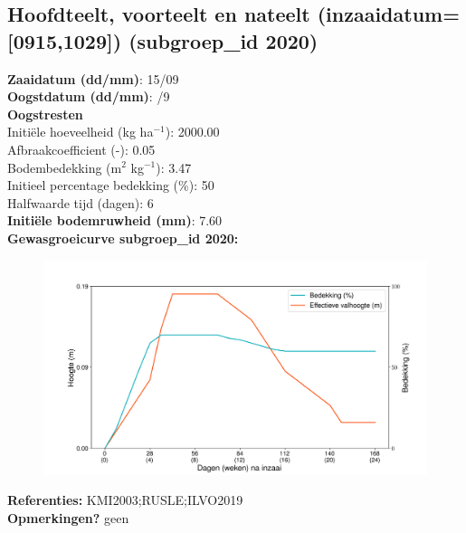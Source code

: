 \documentclass{article}
\begin{document}
 \subsection{Hoofdteelt, voorteelt en nateelt (inzaaidatum=[0915,1029]) (subgroep\_id 2020)} 
  \textbf{Zaaidatum (dd/mm)}: 15/09  \vspace{0.10cm} \\ 
  \textbf{Oogstdatum (dd/mm)}: /9  \vspace{0.10cm} \\ 
  \textbf{Oogstresten} \vspace{0.05cm} \\ 
  \tab Initi\"{e}le hoeveelheid (kg ha$^{-1}$): 2000.00 \vspace{0.05cm} \\ 
  \tab Afbraakcoefficient (-): 0.05 \vspace{0.05cm} \\ 
  \tab Bodembedekking (m$^2$ kg$^{-1}$): 3.47 \vspace{0.05cm} \\ 
  \tab Initieel percentage bedekking (\%): 50 \vspace{0.05cm} \\ 
  \tab Halfwaarde tijd (dagen): 6 \vspace{0.05cm} \\ 
  \textbf{Initi\"{e}le bodemruwheid (mm)}: 7.60 \vspace{0.05cm} \\ 
  \textbf{Gewasgroeicurve subgroep\_id 2020:} 
 \begin{center} \begin{figure}[H] \includegraphics[width=12.5cm]{temp/2020.png} \end{figure} \end{center} 
  \textbf{Referenties:} KMI2003;RUSLE;ILVO2019 \vspace{0.10cm} \\ 
  \textbf{Opmerkingen?} geen \vspace{0.10cm} \\ 
 \newpage 
\end{document}
